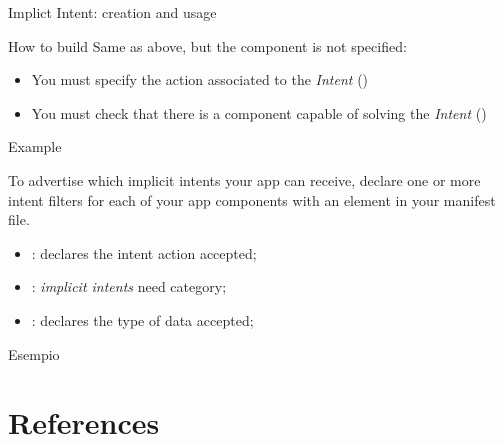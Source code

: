 \documentclass{beamer}
\begin{document}
\begin{frame}{Implict Intent: creation and usage}
  \begin{block}{How to build}
    Same as above, but the component is not specified:
    \begin{itemize}
      \item You must specify the action associated to the \textit{Intent} ()
      \item You must check that there is a component capable of solving the \textit{Intent} ()
    \end{itemize}
  \end{block}
  \begin{exampleblock}{Example}
    
  \end{exampleblock}
  To advertise which implicit intents your app can receive, declare one or more intent filters
  for each of your app components with an  element in your manifest file.
  \begin{itemize}
    \item {}: declares the intent action accepted;
    \item {}: \textit{implicit intents} need  category; 
    \item {}: declares the type of data accepted;
  \end{itemize}
  \begin{exampleblock}{Esempio}
    
  \end{exampleblock}
\end{frame}

\section*{References}

\end{document}
